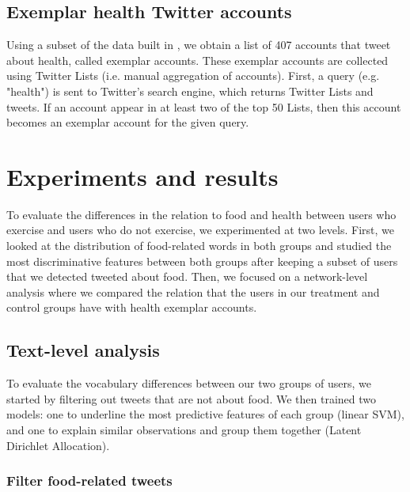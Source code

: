 \documentclass[letterpaper]{article}
\begin{document}
\subsection{Exemplar health Twitter accounts}

Using a subset of the data built in \cite{culotta2016mining}, we obtain a list
of 407 accounts that tweet about health, called exemplar accounts. These
exemplar accounts are collected using Twitter Lists (i.e. manual aggregation of
accounts). First, a query (e.g. "health") is sent to Twitter's search engine,
which returns Twitter Lists and tweets. If an account appear in at least two of
the top 50 Lists, then this account becomes an exemplar account for the given
query.

\section{Experiments and results}

To evaluate the differences in the relation to food and health between users who exercise and users who do not exercise, we experimented at two levels. First, we looked at the distribution of food-related words in both groups and studied the most discriminative features between both groups after keeping a subset of users that we detected tweeted about food. Then, we focused on a network-level analysis where we compared the relation that the users in our treatment and control groups have with health exemplar accounts.


\subsection{Text-level analysis}

To evaluate the vocabulary differences between our two groups of users, we started by filtering out tweets that are not about food. We then trained two models: one to underline the most predictive features of each group (linear SVM), and one to explain similar observations and group them together (Latent Dirichlet Allocation).

\subsubsection{Filter food-related tweets}
\end{document}

